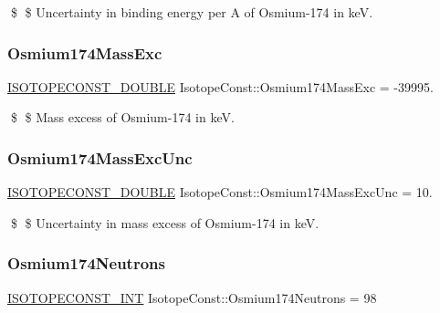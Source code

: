 \$ \$ Uncertainty in binding energy per A of Osmium-\/174 in keV. \mbox{\label{group___isotope_const-_osmium-_os174_ga6ec379daf3e8a1428f3ad9a7a0e865be}} 
\subsubsection{\texorpdfstring{Osmium174\+Mass\+Exc}{Osmium174MassExc}}
{\footnotesize\ttfamily \mbox{\hyperlink{group___isotope_const-_macros_ga8f45a7272ce02c0b4c65c44636ed719a}{I\+S\+O\+T\+O\+P\+E\+C\+O\+N\+S\+T\+\_\+\+D\+O\+U\+B\+LE}} Isotope\+Const\+::\+Osmium174\+Mass\+Exc = -\/39995.}

\$ \$ Mass excess of Osmium-\/174 in keV. \mbox{\label{group___isotope_const-_osmium-_os174_ga15afc7a40645612e1a128c1ac40164f1}} 
\subsubsection{\texorpdfstring{Osmium174\+Mass\+Exc\+Unc}{Osmium174MassExcUnc}}
{\footnotesize\ttfamily \mbox{\hyperlink{group___isotope_const-_macros_ga8f45a7272ce02c0b4c65c44636ed719a}{I\+S\+O\+T\+O\+P\+E\+C\+O\+N\+S\+T\+\_\+\+D\+O\+U\+B\+LE}} Isotope\+Const\+::\+Osmium174\+Mass\+Exc\+Unc = 10.}

\$ \$ Uncertainty in mass excess of Osmium-\/174 in keV. \mbox{\label{group___isotope_const-_osmium-_os174_ga28f20f8f162e25d81f0402f63d59e99d}} 
\subsubsection{\texorpdfstring{Osmium174\+Neutrons}{Osmium174Neutrons}}
{\footnotesize\ttfamily \mbox{\hyperlink{group___isotope_const-_macros_ga5f18360b3e99483a35c32d789e62621c}{I\+S\+O\+T\+O\+P\+E\+C\+O\+N\+S\+T\+\_\+\+I\+NT}} Isotope\+Const\+::\+Osmium174\+Neutrons = 98}

